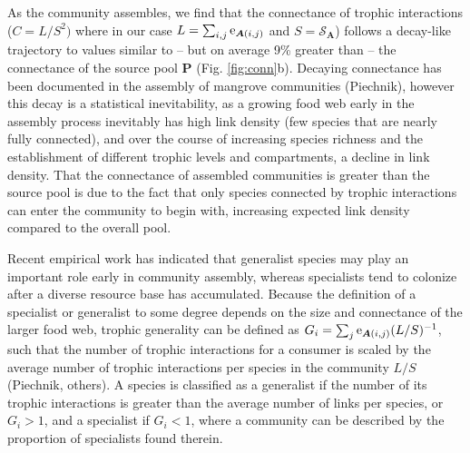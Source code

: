 \documentclass[9pt,twocolumn,twoside]{pnas-new}
\newcommand{\rr}[1]{{\rm #1}}
\begin{document}
As the community assembles, we find that the connectance of trophic interactions ($C=L/S^2)$ where in our case $L=\sum_{i,j} \rr{e}_{{\bm A}(i,j)}$ and $S = \mathcal{S}_{\bm A}$) follows a decay-like trajectory to values similar to -- but on average 9\% greater than -- the connectance of the source pool $\bm{P}$ (Fig. \ref{fig:conn}b).
Decaying connectance has been documented in the assembly of mangrove communities (Piechnik), however this decay is a statistical inevitability, as a growing food web early in the assembly process inevitably has high link density (few species that are nearly fully connected), and over the course of increasing species richness and the establishment of different trophic levels and compartments, a decline in link density.
That the connectance of assembled communities is greater than the source pool is due to the fact that only species connected by trophic interactions can enter the community to begin with, increasing expected link density compared to the overall pool.


Recent empirical work has indicated that generalist species may play an important role early in community assembly, whereas specialists tend to colonize after a diverse resource base has accumulated.
Because the definition of a specialist or generalist to some degree depends on the size and connectance of the larger food web, trophic generality can be defined as $G_i = \sum_j \rr{e}_{{\bm A}(i,j)}(L/S)^{-1}$, such that the number of trophic interactions for a consumer is scaled by the average number of trophic interactions per species in the community $L/S$ (Piechnik, others).
A species is classified as a generalist if the number of its trophic interactions is greater than the average number of links per species, or $G_i > 1$, and a specialist if $G_i < 1$, where a community can be described by the proportion of specialists found therein. %
\end{document}
